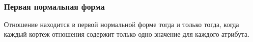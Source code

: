 \begin{frame}

\frametitle{Первая нормальная форма}

Отношение находится в первой нормальной форме тогда и только тогда,
когда каждый кортеж отношения содержит только одно значение для
каждого атрибута.

\end{frame}
